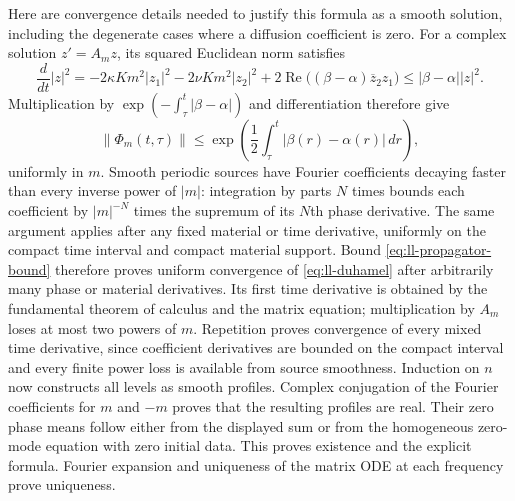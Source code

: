 Here are convergence details needed to justify this formula as a
smooth solution, including the degenerate cases where a diffusion
coefficient is zero. For a complex solution $z'=A_mz$, its squared
Euclidean norm satisfies
\[
\frac{d}{dt}|z|^2
=-2\kappa Km^2|z_1|^2-2\nu Km^2|z_2|^2
 +2\operatorname{Re}\bigl((\beta-\alpha)\overline z_2z_1\bigr)
\leq |\beta-\alpha||z|^2.
\]
Multiplication by
$\exp(-\int_\tau^t|\beta-\alpha|)$ and differentiation therefore
give
\begin{equation}
\|\Phi_m(t,\tau)\|\leq
\exp\left(\frac12\int_\tau^t|\beta(r)-\alpha(r)|\,dr\right),
\label{eq:ll-propagator-bound}
\end{equation}
uniformly in $m$. Smooth periodic sources have Fourier coefficients
decaying faster than every inverse power of $|m|$: integration by
parts $N$ times bounds each coefficient by $|m|^{-N}$ times the
supremum of its $N$th phase derivative. The same argument applies
after any fixed material or time derivative, uniformly on the compact
time interval and compact material support. Bound
\eqref{eq:ll-propagator-bound} therefore proves uniform convergence
of \eqref{eq:ll-duhamel} after arbitrarily many phase or material
derivatives. Its first time derivative is obtained by the fundamental
theorem of calculus and the matrix equation; multiplication by
$A_m$ loses at most two powers of $m$. Repetition proves convergence
of every mixed time derivative, since coefficient derivatives are
bounded on the compact interval and every finite power loss is
available from source smoothness. Induction on $n$ now constructs
all levels as smooth profiles. Complex conjugation of the Fourier
coefficients for $m$ and $-m$ proves that the resulting profiles
are real. Their zero phase means follow either from the displayed
sum or from the homogeneous zero-mode equation with zero initial data.
This proves existence and the explicit formula. Fourier expansion
and uniqueness of the matrix ODE at each frequency prove uniqueness.

